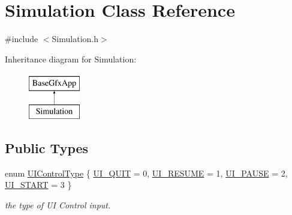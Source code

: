 \hypertarget{classSimulation}{\section{Simulation Class Reference}
\label{classSimulation}
}


{\ttfamily \#include $<$Simulation.\-h$>$}

Inheritance diagram for Simulation\-:\begin{figure}[H]
\begin{center}
\leavevmode
\includegraphics[height=2.000000cm]{classSimulation}
\end{center}
\end{figure}
\subsection*{Public Types}
\begin{DoxyCompactItemize}
\item 
enum \hyperlink{classSimulation_a0fd1c91d4e7699e893929d56b60a60bf}{U\-I\-Control\-Type} \{ \hyperlink{classSimulation_a0fd1c91d4e7699e893929d56b60a60bfa51f628c4a96a151830bd4a541dc42a5f}{U\-I\-\_\-\-Q\-U\-I\-T} = 0, 
\hyperlink{classSimulation_a0fd1c91d4e7699e893929d56b60a60bfae8829fdccf0a3a28e0b0bf8dc47bf26e}{U\-I\-\_\-\-R\-E\-S\-U\-M\-E} = 1, 
\hyperlink{classSimulation_a0fd1c91d4e7699e893929d56b60a60bfa6eb81d656b8ff64239548e4195560ef0}{U\-I\-\_\-\-P\-A\-U\-S\-E} = 2, 
\hyperlink{classSimulation_a0fd1c91d4e7699e893929d56b60a60bfae4ec551adee29b6e2329929952c10ce5}{U\-I\-\_\-\-S\-T\-A\-R\-T} = 3
 \}
\begin{DoxyCompactList}\small\item\em the type of U\-I Control input. \end{DoxyCompactList}\end{DoxyCompactItemize}
